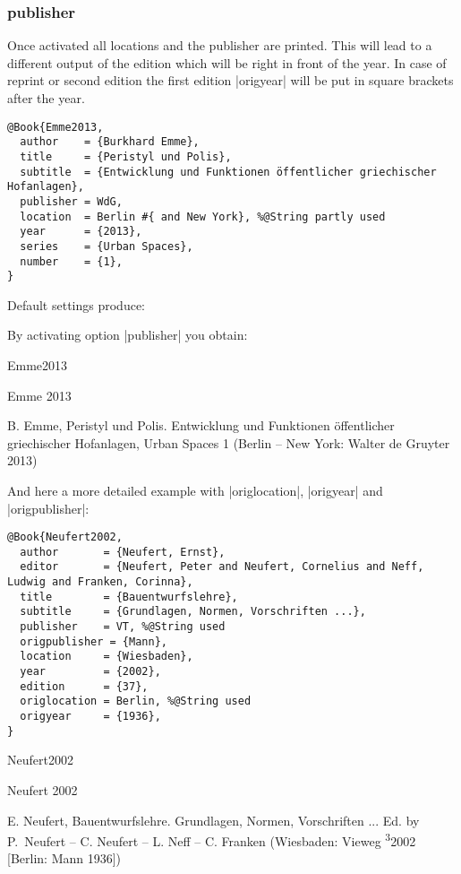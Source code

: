 \documentclass[a4paper,
10pt,
greek,
french,
spanish,
italian,
ngerman,
english
]{ltxdoc}
\begin{document}
\subsubsection{publisher}\label{publisher}
Once activated all locations and the publisher are printed. 
This will lead to a different output of the edition which will be right in front of the year.
In case of reprint or second edition the first edition |origyear| will be put in square brackets after the year.

\begin{lstlisting}[style=bibentry,label=Emme2013,caption={{@}Book\{Emme2013,…\} }]
@Book{Emme2013,
  author    = {Burkhard Emme},
  title     = {Peristyl und Polis},
  subtitle  = {Entwicklung und Funktionen öffentlicher griechischer Hofanlagen},
  publisher = WdG,
  location  = Berlin #{ and New York}, %@String partly used
  year      = {2013},
  series    = {Urban Spaces},
  number    = {1},
}
\end{lstlisting}
\begin{refsection}\end{refsection}

Default settings produce:
 
By activating option |publisher| you obtain:

\begin{bibbsp}{Emme2013}
\parbox[t]{1.7cm}{Emme 2013} \parbox[t]{9.4cm}{B. Emme, Peristyl und Polis. Entwicklung und Funktionen öffentlicher griechischer Hofanlagen, Urban Spaces 1 (Berlin {\color{red} – New York: Walter de Gruyter} 2013)}
\end{bibbsp}
 
And here a more detailed example with |origlocation|, |origyear| and |origpublisher|:
\begin{lstlisting}[style=bibentry,label=Neufert2002,caption={{@}Book\{Neufert2002,…\} }]
@Book{Neufert2002,
  author       = {Neufert, Ernst},
  editor       = {Neufert, Peter and Neufert, Cornelius and Neff, Ludwig and Franken, Corinna},
  title        = {Bauentwurfslehre},
  subtitle     = {Grundlagen, Normen, Vorschriften ...},
  publisher    = VT, %@String used
  origpublisher = {Mann},
  location     = {Wiesbaden},
  year         = {2002},
  edition      = {37},
  origlocation = Berlin, %@String used
  origyear     = {1936},
}
\end{lstlisting}
 

\begin{bibbsp}{Neufert2002}
\parbox[t]{1.7cm}{Neufert  2002} \parbox[t]{9.4cm}{%
E. Neufert, Bauentwurfslehre. Grundlagen, Normen, Vorschriften ... Ed. by P.~Neufert – C. Neufert – L. Neff  – C. Franken {\color{red} (Wiesbaden: Vieweg \textsuperscript{3}2002 [Berlin: Mann 1936])}}
\end{bibbsp}
 
\end{document}
